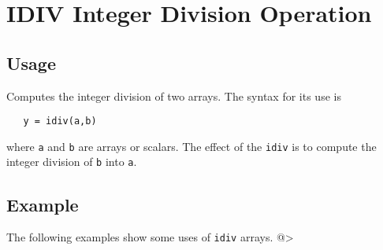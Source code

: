 \section{IDIV Integer Division Operation}

\subsection{Usage}

Computes the integer division of two arrays.  The syntax for its use is
\begin{verbatim}
   y = idiv(a,b)
\end{verbatim}
where \verb|a| and \verb|b| are arrays or scalars.  The effect of the \verb|idiv|
is to compute the integer division of \verb|b| into \verb|a|.
\subsection{Example}

The following examples show some uses of \verb|idiv|
arrays.
@>
